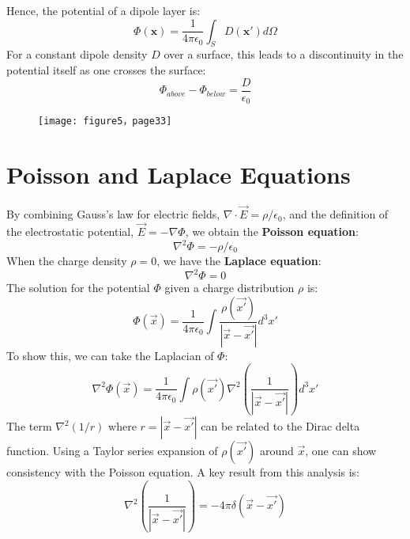 \documentclass[12pt, a4paper]{article}
\begin{document}
	Hence, the potential of a dipole layer is:
	\begin{equation}
		\Phi(\bm{x}) = \frac{1}{4\pi\epsilon_0} \int_S D(\bm{x}') d\Omega
	\end{equation}
	For a constant dipole density $D$ over a surface, this leads to a discontinuity in the potential itself as one crosses the surface:
	\begin{equation}
		\Phi_{above} - \Phi_{below} = \frac{D}{\epsilon_0}
	\end{equation}
	\begin{figure}[h]
		\centering
		\texttt{[image: figure5，page33]}
		\caption{}
		\label{fig:figure5page33}
	\end{figure}
	\section{Poisson and Laplace Equations}
	By combining Gauss's law for electric fields, $\nabla \cdot \vec{E} = \rho / \epsilon_0$, and the definition of the electrostatic potential, $\vec{E} = -\nabla\Phi$, we obtain the \textbf{Poisson equation}:
	\begin{equation*}
		\nabla^2 \Phi = -\rho / \epsilon_0
	\end{equation*}
	When the charge density $\rho = 0$, we have the \textbf{Laplace equation}:
	\begin{equation*}
		\nabla^2 \Phi = 0
	\end{equation*}
	The solution for the potential $\Phi$ given a charge distribution $\rho$ is:
	\begin{equation*}
		\Phi(\vec{x}) = \frac{1}{4\pi\epsilon_0} \int \frac{\rho(\vec{x'})}{|\vec{x}-\vec{x'}|} d^3x'
	\end{equation*}
	To show this, we can take the Laplacian of $\Phi$:
	\begin{equation*}
		\nabla^2 \Phi(\vec{x}) = \frac{1}{4\pi\epsilon_0} \int \rho(\vec{x'}) \nabla^2 \left( \frac{1}{|\vec{x}-\vec{x'}|} \right) d^3x'
	\end{equation*}
	The term $\nabla^2(1/r)$ where $r=|\vec{x}-\vec{x'}|$ can be related to the Dirac delta function. Using a Taylor series expansion of $\rho(\vec{x'})$ around $\vec{x}$, one can show consistency with the Poisson equation. A key result from this analysis is:
	\begin{equation}
		\boxed{
			\nabla^2\left(\frac{1}{|\vec{x}-\vec{x'}|}\right) = -4\pi\delta(\vec{x}-\vec{x'})
		}
	\end{equation}
	
\end{document}
